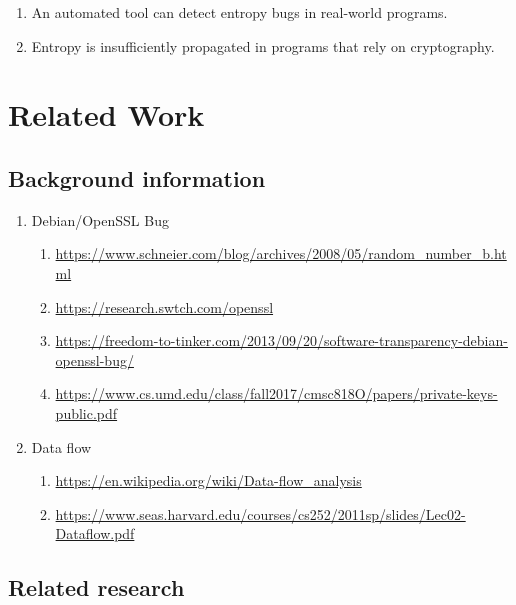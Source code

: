 \documentclass[letterpaper,twocolumn,10pt]{article}
\begin{document}
\begin{enumerate}
	\item An automated tool can detect entropy bugs in real-world programs.
	\item Entropy is insufficiently propagated in programs that rely on cryptography.
\end{enumerate}

\section{Related Work}

\subsection{Background information}

\begin{enumerate}
	\item Debian/OpenSSL Bug 
		\begin{enumerate}
			\item \url{https://www.schneier.com/blog/archives/2008/05/random_number_b.html}
			\item \url{https://research.swtch.com/openssl}
			\item \url{https://freedom-to-tinker.com/2013/09/20/software-transparency-debian-openssl-bug/}
			\item \url{https://www.cs.umd.edu/class/fall2017/cmsc818O/papers/private-keys-public.pdf}
		\end{enumerate}
	\item Data flow
		\begin{enumerate}
			\item \url{https://en.wikipedia.org/wiki/Data-flow_analysis}
			\item \url{https://www.seas.harvard.edu/courses/cs252/2011sp/slides/Lec02-Dataflow.pdf}
		\end{enumerate}

\end{enumerate}

\subsection{Related research}

\end{document}
